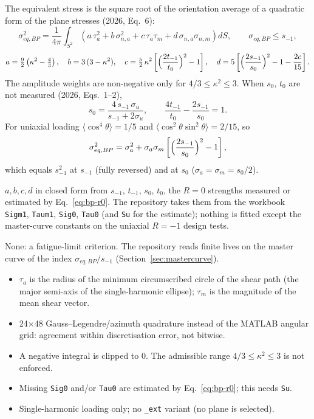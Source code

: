  The equivalent stress is the square root of the orientation average of a
quadratic form of the plane stresses (2026, Eq.~6):
\begin{equation}
\sigma_{eq,BP}^2=\frac{1}{4\pi}\int_{S^2}\left(a\,\tau_a^2+b\,\sigma_{n,a}^2+c\,\tau_a\tau_m+d\,\sigma_{n,a}\sigma_{n,m}\right)dS ,
\qquad \sigma_{eq,BP}\le s_{-1},
\label{eq:bp-main}
\end{equation}
\begin{equation}
a=\tfrac92\left(\kappa^2-\tfrac43\right),\quad
b=3\,(3-\kappa^2),\quad
c=\tfrac52\,\kappa^2\left[\Bigl(\frac{2t_{-1}}{t_0}\Bigr)^2-1\right],\quad
d=5\left[\Bigl(\frac{2s_{-1}}{s_0}\Bigr)^2-1-\frac{2c}{15}\right].
\label{eq:bp-coef}
\end{equation}
The amplitude weights are non-negative only for $4/3\le\kappa^2\le3$. When $s_0$, $t_0$ are not
measured (2026, Eqs.~1--2),
\begin{equation}
s_0=\frac{4\,s_{-1}\,\sigma_u}{s_{-1}+2\sigma_u},\qquad \frac{4t_{-1}}{t_0}-\frac{2s_{-1}}{s_0}=1 .
\label{eq:bp-r0}
\end{equation}
For uniaxial loading $\langle\cos^4\theta\rangle=1/5$ and $\langle\cos^2\theta\sin^2\theta\rangle=2/15$,
so
\begin{equation}
\sigma_{eq,BP}^2=\sigma_a^2+\sigma_a\sigma_m\left[\Bigl(\frac{2s_{-1}}{s_0}\Bigr)^2-1\right],
\label{eq:bp-uni}
\end{equation}
which equals $s_{-1}^2$ at $s_{-1}$ (fully reversed) and at $s_0$ ($\sigma_a=\sigma_m=s_0/2$).

 $a,b,c,d$ in closed form from $s_{-1}$, $t_{-1}$, $s_0$, $t_0$, the
$R=0$ strengths measured or estimated by Eq.~\eqref{eq:bp-r0}. The repository takes them from the
workbook \texttt{Sigm1}, \texttt{Taum1}, \texttt{Sig0}, \texttt{Tau0} (and \texttt{Su} for the
estimate); nothing is fitted except the master-curve constants on the uniaxial $R=-1$ design tests.

 None: a fatigue-limit criterion. The repository reads finite lives on the master curve
of the index $\sigma_{eq,BP}/s_{-1}$ (Section~\ref{sec:mastercurve}).

\begin{itemize}
\item $\tau_a$ is the radius of the minimum circumscribed circle of the shear path (the major
  semi-axis of the single-harmonic ellipse); $\tau_m$ is the magnitude of the mean shear vector.
\item 24$\times$48 Gauss--Legendre/azimuth quadrature instead of the MATLAB angular grid: agreement
  within discretisation error, not bitwise.
\item A negative integral is clipped to 0. The admissible range $4/3\le\kappa^2\le3$ is not enforced.
\item Missing \texttt{Sig0} and/or \texttt{Tau0} are estimated by Eq.~\eqref{eq:bp-r0}; this needs
  \texttt{Su}.
\item Single-harmonic loading only; no \texttt{\_ext} variant (no plane is selected).
\end{itemize}

